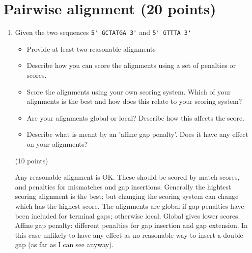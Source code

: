 \documentclass[11pt]{article}
\begin{document}
\section{Pairwise alignment (20 points)}
\begin{enumerate}
\item Given the two sequences \verb|5' GCTATGA 3'| and \verb|5' GTTTA 3'|\\
  \begin{itemize}
    \item Provide at least two reasonable alignments
    \item Describe how you can score the alignments using a set of penalties
      or scores.
    \item Score the alignments using your own scoring system. Which of your
      alignments is the best and how does this relate to your scoring system?
    \item Are your alignments global or local? Describe how this affects the
      score.
    \item Describe what is meant by an 'affine gap penalty'. Does it have any
      effect on your alignments?
  \end{itemize}
  (10 points)

\begin{Notes}
  Any reasonable alignment is OK. These should be scored by match scores, 
  and penalties for mismatches and gap insertions. Generally the hightest
  scoring alignment is the best; but changing the scoring system can change
  which has the highest score. The alignments are global if gap penalties
  have been included for terminal gaps; otherwise local. Global gives lower
  scores. Affine gap penalty: different penalties for gap insertion and gap
  extension. In this case unlikely to have any effect as no reasonable way
  to insert a double gap (as far as I can see anyway).
\end{Notes}



\end{enumerate}
\end{document}
